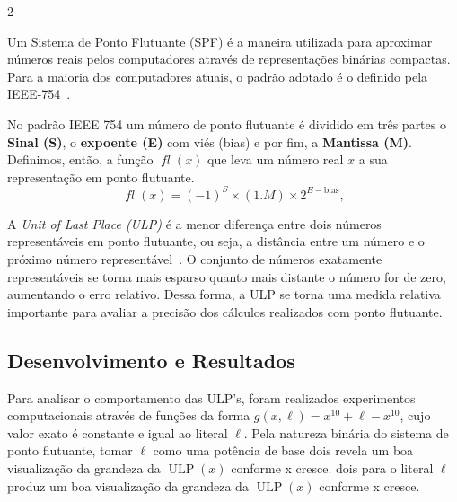 \documentclass[a0,portrait]{a0poster}
\DeclareMathOperator{\ulp}{ULP}
\DeclareMathOperator{\fl}{\textit{fl}}
\begin{document}
\begin{multicols}{2}
  \begin{justify}\setlength{\parindent}{5ex} \indent \par
    Um Sistema de Ponto Flutuante (SPF) é a maneira utilizada para aproximar
    números reais pelos computadores através de representações binárias compactas.
    Para a maioria dos computadores atuais, o padrão adotado é o definido pela
    IEEE-754~\cite{IEEE754}.

    No padrão IEEE 754 um número de ponto flutuante é dividido em três partes o
    \textbf{Sinal (S)}, o \textbf{expoente (E)} com viés (bias) e por fim, a
    \textbf{Mantissa (M)}. Definimos, então, a função $\fl(x)$ que leva um número
    real $x$ a sua representação em ponto flutuante.
    \begin{equation}
      \fl(x) =
      \left(-1\right)^S
      \times
      \left(1.M\right)
      \times
      2^{E - \text{bias}},
      \label{eq:spf}
    \end{equation}

    \hspace*{2.5cm}A \textit{Unit of Last Place (ULP)} é a menor diferença entre dois números
    representáveis em ponto flutuante, ou seja, a distância entre um número e o
    próximo número representável~\cite{kahan2004,muller2005}. O conjunto de números
    exatamente representáveis se torna mais esparso quanto mais distante o número
    for de zero, aumentando o erro relativo. Dessa forma, a ULP se torna uma medida
    relativa importante para avaliar a precisão dos cálculos realizados com ponto
    flutuante.

  \end{justify}
  \vspace{-1cm}
  \color{SaddleBrown}

  \begin{center}
    \section*{Desenvolvimento e Resultados}
  \end{center}
  \color{Black}
  \begin{justify}
    \setlength{\parindent}{5ex} \indent \par
    \vspace{-2cm}

    Para analisar o comportamento das ULP's, foram realizados experimentos
    computacionais através de funções da forma $g(x,\ell) = x^{10} + \ell -
      x^{10}$, cujo valor exato é constante e igual ao literal $\ell$. Pela natureza
    binária do sistema de ponto flutuante, tomar $\ell$ como uma potência de base
    dois revela um boa visualização da grandeza da $\ulp(x)$ conforme x cresce.
    dois para o literal $\ell$ produz um boa visualização da grandeza da $\ulp(x)$
    conforme x cresce.


\end{justify}
\end{multicols}
\end{document}

